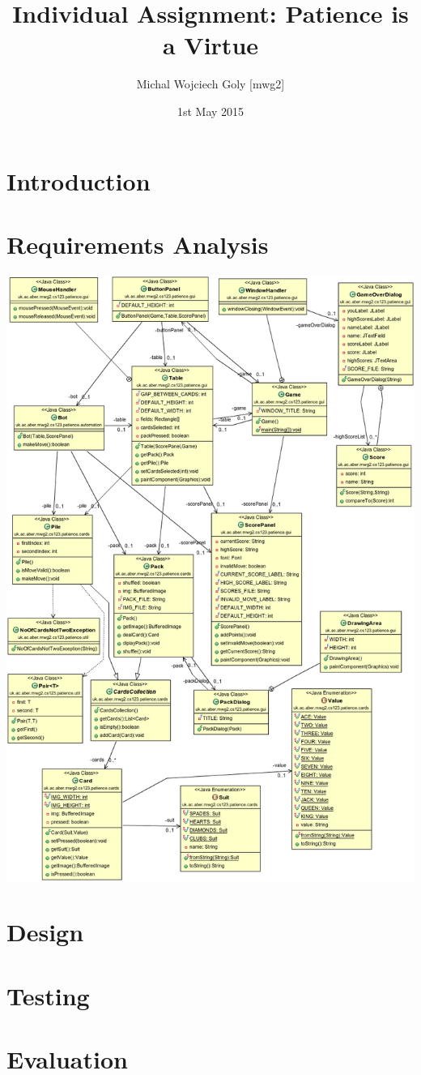 \documentclass[a4paper, 12pt, titlepage]{article}
\title{Individual Assignment: Patience is a Virtue}
\author{Michal Wojciech Goly [mwg2]}
\date{1st May 2015}
\begin{document}
\maketitle
\tableofcontents
\newpage

\section{Introduction}
\newpage

\section{Requirements Analysis}
\includegraphics[width=\textwidth]{classDiagram}

\section{Design}

\section{Testing}

\section{Evaluation}
\end{document}
